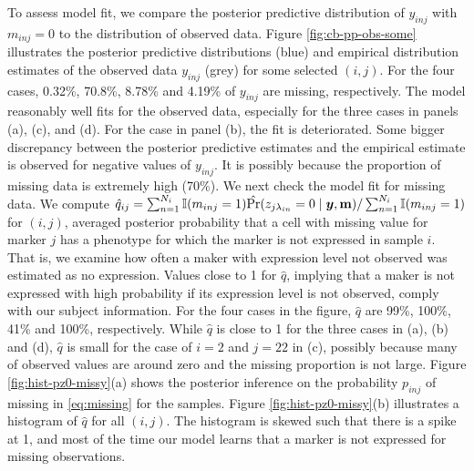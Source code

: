 \documentclass[12pt,]{article}
\def\Prob{\text{Pr}}
\newcommand{\by}{\mbox{\boldmath $y$}}
\newcommand{\ech}{\color{Black}\rm}
\newcommand{\hh}{\color{Mahogany}\it}
\begin{document}
To assess model fit, we compare the posterior predictive distribution of
$y_{inj}$ with $m_{inj}=0$ to the distribution of observed data. Figure
\ref{fig:cb-pp-obs-some} illustrates the posterior predictive distributions
(blue) and empirical distribution estimates of the observed data $y_{inj}$
(grey) for some selected $(i,j)$.  For the four cases, 0.32\%, 70.8\%, 8.78\%
and 4.19\% of $y_{inj}$ are missing, respectively.   The model reasonably well
fits for the observed data, especially for the three cases in panels (a), (c),
and (d).  For the case in panel (b), the fit is deteriorated. Some bigger
discrepancy between the posterior predictive estimates and the empirical
estimate is observed for negative values of $y_{inj}$.  It is  possibly because
the proportion of missing data is extremely high (70\%).  
We next check the model fit for missing data.  We compute $\hat{q}_{ij}=
\sum_{n=1}^{N_i}\mathbb{I}(m_{inj}=1)\hat{\Prob}(z_{j \lambda_{in}}=0 \mid \by,
{\bf m})/\sum_{n=1}^{N_i}\mathbb{I}  (m_{inj}=1)$
for $(i,j)$, averaged posterior probability that a cell
with missing value for marker $j$ has a phenotype for which the marker is not
expressed in sample $i$.  That is, we examine how often a maker with expression
level not observed was estimated as no expression. Values close to 1 for
$\hat{q}$, implying that a maker is not expressed with high probability if its
expression level is not observed, comply with our subject information.  For the
four cases in the figure, $\hat{q}$ are 99\%, 100\%, 41\% and 100\%,
respectively. While $\hat{q}$ is close to 1 for the three cases in (a), (b) and
(d), $\hat{q}$ is small for the case of $i=2$ and $j=22$ in (c), possibly
because many of observed values are around zero and the missing proportion is
not large. Figure \ref{fig:hist-pz0-missy}(a) shows the posterior inference on
the probability $p_{inj}$ of missing in \eqref{eq:missing} for the samples.
%
%
Figure \ref{fig:hist-pz0-missy}(b) illustrates a histogram of $\hat{q}$ for all
$(i,j)$. The histogram is skewed such that there is a spike at 1, and most of
the time our model learns that a marker is not expressed for missing
observations.
\end{document}
